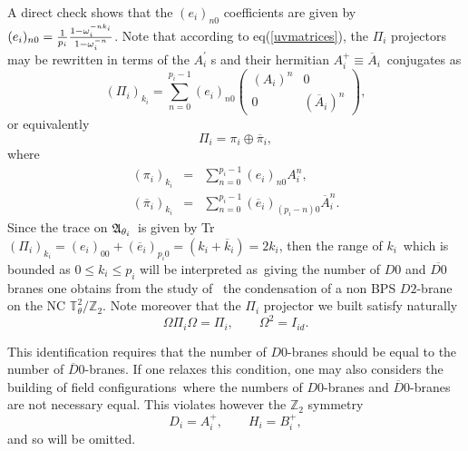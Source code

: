 \documentclass[a4paper,12pt]{article}
\begin{document}
A direct check shows that the $%
(e_{i})_{n0}$ coefficients are given by $(e_{i})_{n0}=\frac{1}{p_{i}}\frac{%
1-\omega _{i}^{-nk_i}}{1-\omega _{i}^{-n}}$. Note that according to eq(\ref{uvmatrices}),
the $\Pi _{i}$ projectors may be rewritten in terms of the $A_{i}^{\prime }$%
s and their hermitian $A_{i}^{+}\equiv \overline{A}_{i}$\ conjugates as
\begin{equation}
(\Pi _{i})_{k_{i}}=\sum_{n=0}^{p_{i}-1}(e_{i})_{n0}\left(
\begin{array}{cc}
(A_{i})^{n} & 0 \\
0 & (\overline{A}_{i})^{n}
\end{array}
\right) ,  \label{ratpro}
\end{equation}
or equivalently
\begin{equation*}
\Pi _{i}=\pi _{i}\oplus \overline{\pi }_{i},
\end{equation*}
where
\begin{eqnarray}
(\pi _{i})_{k_{i}} &=&\sum_{n=0}^{p_{i}-1}(e_{i})_{n0}A_{i}^{n}, \\
(\overline{\pi }_{i})_{k_{i}} &=&\sum_{n=0}^{p_{i}-1}(\overline{e}%
_{i})_{(p_{i}-n)0}\overline{A}_{i}^{n}.
\end{eqnarray}
Since the trace on $\frak{A}_{\theta _{i}}$\ is given by Tr$(\Pi
_{i})_{k_{i}}=(e_{i})_{00}+(\overline{e}_{i})_{p_{i}0}=(k_i+{\overline
k}_i)=2k_{i}$, then the range of $k_{i}$\ which is bounded as
$0\leq k_{i}\leq p_{i}$ will be interpreted as\ giving the number
of $D0$ and $\overline{D0}$ branes  one obtains from the study of
\ the condensation of a non BPS $D2$-brane on the NC
$\mathbb{T}_{\theta }^{2}/\mathbb{Z}_{2}$. Note moreover that the
$\Pi _{i}$ projector we built satisfy naturally
\begin{equation}\label{identification}
\Omega \Pi _{i}\Omega =\Pi _{i},\qquad \Omega ^{2}=I_{id}.
\end{equation}

This identification requires that the number of $D0$-branes should be equal
to the number of $\overline{D}0$-branes. If one relaxes this condition, one
may also considers the building of field configurations\  where
the numbers of $D0$-branes and $\overline{D}0$-branes are not necessary
equal. This violates however the $\mathbb{Z}_{2}$ symmetry
\begin{equation}\label{hermitic}
D_{i}=A_{i}^{+},\qquad H_{i}=B_{i}^{+},
\end{equation}
and so will be omitted.

\bigskip
\end{document}
